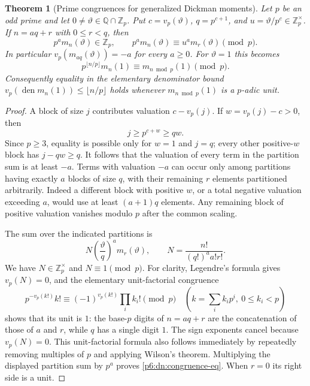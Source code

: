 \documentclass[11pt,a4paper]{article}
\newtheorem{theorem}{Theorem}[section]
\theoremstyle{definition}
\theoremstyle{remark}
\numberwithin{equation}{section}
\begin{document}
\begin{theorem}[Prime congruences for generalized Dickman moments]
\label{p6:dn:congruence}
Let $p$ be an odd prime and let $0\ne\vartheta\in\mathbb Q\cap\mathbb Z_p$.
Put $c=v_p(\vartheta)$, $q=p^{c+1}$, and
$u=\vartheta/p^c\in\mathbb Z_p^\times$.  If $n=aq+r$ with
$0\le r<q$, then
\begin{equation}\label{p6:dn:congruence-eq}
 p^a m_n(\vartheta)\in\mathbb Z_p,
 \qquad p^a m_n(\vartheta)\equiv u^a m_r(\vartheta)\pmod p.
\end{equation}
In particular $v_p(m_{aq}(\vartheta))=-a$ for every $a\ge0$.
For $\vartheta=1$ this becomes
\[
 p^{\lfloor n/p\rfloor}m_n(1)
       \equiv m_{n\bmod p}(1)\pmod p.
\]
Consequently equality in the elementary denominator bound
$v_p(\operatorname{den}m_n(1))\le\lfloor n/p\rfloor$ holds
whenever $m_{n\bmod p}(1)$ is a $p$-adic unit.
\end{theorem}
\begin{proof}
A block of size $j$ contributes valuation $c-v_p(j)$.
If $w=v_p(j)-c>0$, then
\[
 j\ge p^{c+w}\ge q w.
\]
Since $p\ge3$, equality is possible only for $w=1$ and $j=q$;
every other positive-$w$ block has $j-qw\ge q$.
It follows that the valuation of every term in the partition sum is
at least $-a$.  Terms with valuation $-a$ can occur only among
partitions having exactly $a$ blocks of size $q$, with their remaining
$r$ elements partitioned arbitrarily.  Indeed a different block with
positive $w$, or a total negative valuation exceeding $a$, would use
at least $(a+1)q$ elements.  Any remaining block of positive valuation
vanishes modulo $p$ after the common scaling.

The sum over the indicated partitions is
\[
 N\left(\frac{\vartheta}{q}\right)^a m_r(\vartheta),
 \qquad N=\frac{n!}{(q!)^a a!r!}.
\]
We have $N\in\mathbb Z_p^\times$ and $N\equiv1\pmod p$.
For clarity, Legendre's formula gives $v_p(N)=0$, and the elementary
unit-factorial congruence
\[
 p^{-v_p(k!)}k!\equiv
 (-1)^{v_p(k!)}\prod_i k_i!\pmod p
 \quad\left(k=\sum_i k_i p^i,\ 0\le k_i<p\right)
\]
shows that its unit is $1$: the base-$p$ digits of $n=aq+r$ are
the concatenation of those of $a$ and $r$, while $q$ has a single
digit $1$.  The sign exponents cancel because $v_p(N)=0$.
This unit-factorial formula also follows immediately by repeatedly
removing multiples of $p$ and applying Wilson's theorem.
Multiplying the displayed partition sum by $p^a$ proves
\eqref{p6:dn:congruence-eq}.  When $r=0$ its right side is a unit.
\end{proof}
\end{document}
